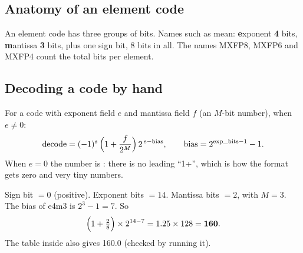 \subsection{Anatomy of an element code}
An element code has three groups of bits. Names such as  mean: \textbf{e}xponent \textbf{4} bits,
\textbf{m}antissa \textbf{3} bits, plus one sign bit, 8 bits in all. The names MXFP8, MXFP6 and MXFP4
count the total bits per element.

\begin{center}
\end{center}

\subsection{Decoding a code by hand}
For a code with exponent field $e$ and mantissa field $f$ (an $M$-bit number), when $e\neq0$:
\begin{equation}\label{eq:decode}
\operatorname{decode}=(-1)^{s}\,\Bigl(1+\frac{f}{2^{M}}\Bigr)\,2^{\,e-\mathrm{bias}},\qquad
\mathrm{bias}=2^{\text{exp\_bits}-1}-1 .
\end{equation}
When $e=0$ the number is : there is no leading ``1+'', which is how the format gets zero and very
tiny numbers.

\begin{worked}
Sign bit $=0$ (positive). Exponent bits  $=14$. Mantissa bits  $=2$, with $M=3$. The bias of
e4m3 is $2^{3}-1=7$. So
\[
\Bigl(1+\tfrac{2}{8}\Bigr)\times2^{14-7}=1.25\times128=\mathbf{160}.
\]
The table inside  also gives 160.0 (checked by running it).
\end{worked}


